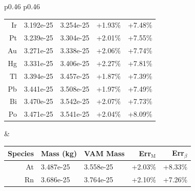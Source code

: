 \documentclass[12pt]{article}
\begin{document}
\begin{table}[htbp]
\begin{tabular}{p{0.46\linewidth} p{0.46\linewidth}}
\begin{tabular}{|rllrr|}
Ir  & 3.192e-25 & 3.254e-25     & +1.93\% \tikz[baseline=-0.5ex]{\node[draw=none,fill=green,circle,inner sep=3pt]{};}          & +7.48\% \tikz[baseline=-0.5ex]{\node[draw=none,fill=orange,circle,inner sep=3pt]{};}  \\
Pt  & 3.239e-25 & 3.304e-25     & +2.01\% \tikz[baseline=-0.5ex]{\node[draw=none,fill=green,circle,inner sep=3pt]{};}          & +7.55\% \tikz[baseline=-0.5ex]{\node[draw=none,fill=orange,circle,inner sep=3pt]{};}  \\
Au  & 3.271e-25 & 3.338e-25     & +2.06\% \tikz[baseline=-0.5ex]{\node[draw=none,fill=green,circle,inner sep=3pt]{};}          & +7.74\% \tikz[baseline=-0.5ex]{\node[draw=none,fill=orange,circle,inner sep=3pt]{};}  \\
Hg  & 3.331e-25 & 3.406e-25     & +2.27\% \tikz[baseline=-0.5ex]{\node[draw=none,fill=green,circle,inner sep=3pt]{};}          & +7.81\% \tikz[baseline=-0.5ex]{\node[draw=none,fill=orange,circle,inner sep=3pt]{};}  \\
Tl  & 3.394e-25 & 3.457e-25     & +1.87\% \tikz[baseline=-0.5ex]{\node[draw=none,fill=green,circle,inner sep=3pt]{};}          & +7.39\% \tikz[baseline=-0.5ex]{\node[draw=none,fill=orange,circle,inner sep=3pt]{};}  \\
Pb  & 3.441e-25 & 3.508e-25     & +1.97\% \tikz[baseline=-0.5ex]{\node[draw=none,fill=green,circle,inner sep=3pt]{};}          & +7.49\% \tikz[baseline=-0.5ex]{\node[draw=none,fill=orange,circle,inner sep=3pt]{};}  \\
Bi  & 3.470e-25 & 3.542e-25     & +2.07\% \tikz[baseline=-0.5ex]{\node[draw=none,fill=green,circle,inner sep=3pt]{};}          & +7.73\% \tikz[baseline=-0.5ex]{\node[draw=none,fill=orange,circle,inner sep=3pt]{};}  \\
Po  & 3.471e-25 & 3.541e-25     & +2.04\% \tikz[baseline=-0.5ex]{\node[draw=none,fill=green,circle,inner sep=3pt]{};}          & +8.09\% \tikz[baseline=-0.5ex]{\node[draw=none,fill=orange,circle,inner sep=3pt]{};}  \\
\bottomrule
\end{tabular} &
\begin{tabular}{|rllrr|}
\toprule
Species & Mass (kg) & VAM Mass & Err$_\text{M}$ & Err$_\beta$ \\
\midrule
At  & 3.487e-25 & 3.558e-25     & +2.03\% \tikz[baseline=-0.5ex]{\node[draw=none,fill=green,circle,inner sep=3pt]{};}          & +8.33\% \tikz[baseline=-0.5ex]{\node[draw=none,fill=orange,circle,inner sep=3pt]{};}  \\
Rn  & 3.686e-25 & 3.764e-25     & +2.10\% \tikz[baseline=-0.5ex]{\node[draw=none,fill=green,circle,inner sep=3pt]{};}          & +7.26\% \tikz[baseline=-0.5ex]{\node[draw=none,fill=orange,circle,inner sep=3pt]{};}  \\

\end{tabular}
\end{tabular}
\end{table}
\end{document}

